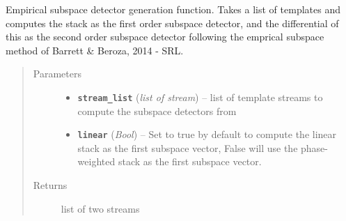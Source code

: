 \documentclass[a4paper,10pt,english]{sphinxmanual}
\begin{document}
\begin{fulllineitems}
\label{submodules/utils.clustering:clustering.empirical_SVD}
Empirical subspace detector generation function.  Takes a list of templates
and computes the stack as the first order subspace detector, and the
differential of this as the second order subspace detector following
the emprical subspace method of Barrett \& Beroza, 2014 - SRL.
\begin{quote}\begin{description}
\item[{Parameters}] \leavevmode\begin{itemize}
\item {} 
\textbf{\texttt{stream\_list}} (\emph{list of stream}) -- list of template streams to compute the subspace detectors        from

\item {} 
\textbf{\texttt{linear}} (\emph{Bool}) -- Set to true by default to compute the linear stack as the        first subspace vector, False will use the phase-weighted stack as the        first subspace vector.

\end{itemize}

\item[{Returns}] \leavevmode
list of two streams

\end{description}\end{quote}

\end{fulllineitems}

\end{document}
